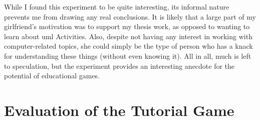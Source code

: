 \noindent
While I found this experiment to be quite interesting, its informal nature prevents me from drawing any real conclusions. It is likely that a large part of my girlfriend's motivation was to support my thesis work, as opposed to wanting to learn about \gls{uml} Activities. Also, despite not having any interest in working with computer-related topics, she could simply be the type of person who has a knack for understanding these things (without even knowing it). All in all, much is left to speculation, but the experiment provides an interesting anecdote for the potential of educational games.

\section{Evaluation of the Tutorial Game}
\label{sec:game_evaluation}


